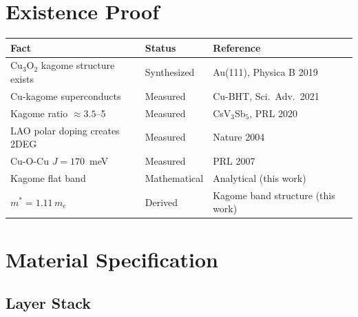 \documentclass[11pt, a4paper]{article}
\begin{document}
\section{Existence Proof}

\begin{center}
\begin{tabular}{@{}lll@{}}
\toprule
\textbf{Fact} & \textbf{Status} & \textbf{Reference} \\
\midrule
Cu$_3$O$_2$ kagome structure exists & Synthesized &
  Au(111), Physica B 2019 \\
Cu-kagome superconducts & Measured &
  Cu-BHT, Sci.\ Adv.\ 2021 \\
Kagome ratio $\approx 3.5$--5 & Measured &
  CsV$_3$Sb$_5$, PRL 2020 \\
LAO polar doping creates 2DEG & Measured &
  Nature 2004 \\
Cu-O-Cu $J = 170$~meV & Measured &
  PRL 2007 \\
Kagome flat band & Mathematical &
  Analytical (this work) \\
$m^* = 1.11\,m_e$ & Derived &
  Kagome band structure (this work) \\
\bottomrule
\end{tabular}
\end{center}

\section{Material Specification}

\subsection{Layer Stack}
\end{document}

